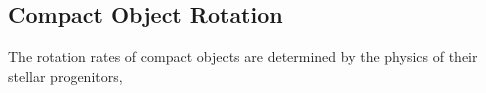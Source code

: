{\color{orange}

\subsection{Compact Object Rotation}

The rotation rates of compact objects are determined by the physics of their stellar progenitors, 

}